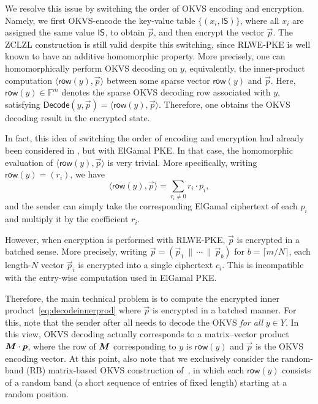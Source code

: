 We resolve this issue by switching the order of OKVS encoding and encryption. Namely, we first OKVS-encode the key-value table $\{(x_i, \mathsf{IS})\}$, where all $x_i$ are assigned the same value ${\sf IS}$, to obtain $\vec{p}$, and then encrypt the vector $\vec p$. The ZCLZL construction is still valid despite this switching, since RLWE-PKE is well known to have an additive homomorphic property. More precisely, one can homomorphically perform OKVS decoding on $y$, equivalently, the inner-product computation $\langle \mathsf{row}(y), \vec{p} \rangle$ between some sparse vector $\mathsf{row}(y)$ and $\vec{p}$. Here, $\mathsf{row}(y)\in\mathbb{F}^{m}$ denotes the sparse OKVS decoding row associated with $y$, satisfying $\mathsf{Decode}(y,\vec{p})=\langle\mathsf{row}(y),\vec{p}\rangle$. Therefore, one obtains the OKVS decoding result in the encrypted state.

In fact, this idea of switching the order of encoding and encryption had already been considered in \cite{ZCL+24}, but with ElGamal PKE. In that case, the homomorphic evaluation of $\langle \mathsf{row}(y), \vec{p} \rangle$ is very trivial. More specifically, writing $\mathsf{row}(y) = (r_i)$, we have
\begin{equation}\label{eq:decodeinnerprod}
\langle \mathsf{row}(y), \vec{p} \rangle = \sum_{r_i \neq 0} r_i \cdot p_i,
\end{equation}
and the sender can simply take the corresponding ElGamal ciphertext of each $p_i$ and multiply it by the coefficient $r_i$.

However, when encryption is performed with RLWE-PKE, $\vec{p}$ is encrypted in a batched sense. More precisely, writing $\vec{p} = (\vec{p}_1 \,\|\, \cdots \,\|\, \vec{p}_b)$ for $b = \lceil m / N \rceil$, each length-$N$ vector $\vec{p}_i$ is encrypted into a single ciphertext $c_i$. This is incompatible with the entry-wise computation used in ElGamal PKE.


Therefore, the main technical problem is to compute the encrypted inner product~\eqref{eq:decodeinnerprod} where $\vec{p}$ is encrypted in a batched manner. For this, note that the sender after all needs to decode the OKVS \emph{for all} $y \in Y$. In this view, OKVS decoding actually corresponds to a matrix--vector product $\bm{M} \cdot \bm{p}$, where the row of $\bm{M}$ corresponding to $y$ is $\mathsf{row}(y)$ and $\vec{p}$ is the OKVS encoding vector. At this point, also note that we exclusively consider the random-band (RB) matrix-based OKVS construction of~\cite{BPSY23}, in which each $\mathsf{row}(y)$ consists of a random band (a short sequence of entries of fixed length) starting at a random position.

